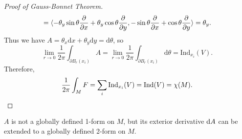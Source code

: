 \begin{proof}[Proof of Gauss-Bonnet Theorem]
\begin{align*}
        = \langle -\theta_y\sin\theta \frac{\partial }{\partial x} + \theta_y\cos\theta \frac{\partial }{\partial y}, -\sin\theta \frac{\partial }{\partial x} + \cos\theta \frac{\partial }{\partial y} \rangle 
        = \theta_y.
    \end{align*}
    Thus we have $A = \theta_x \mathrm{d}x + \theta_y \mathrm{d}y = \mathrm{d}\theta$, so 
    \begin{equation*}
        \lim_{r\to 0} \frac{1}{2\pi}\int_{\partial B_r(x_i)} A 
        = \lim_{r\to 0} \frac{1}{2\pi}\int_{\partial B_r(x_i)} \mathrm{d}\theta 
        = \mathrm{Ind}_{x_i}(V).
    \end{equation*}
    Therefore, 
    \begin{equation*}
        \frac{1}{2\pi}\int_M F = \sum_i \mathrm{Ind}_{x_i}(V) = \mathrm{Ind}(V) = \chi(M). \qedhere
    \end{equation*}
\end{proof}
\begin{remark}
    $A$ is not a globally defined 1-form on $M$, 
    but its exterior derivative ${\rm d} A$ can be extended to a globally defined 2-form on $M$.
\end{remark}
